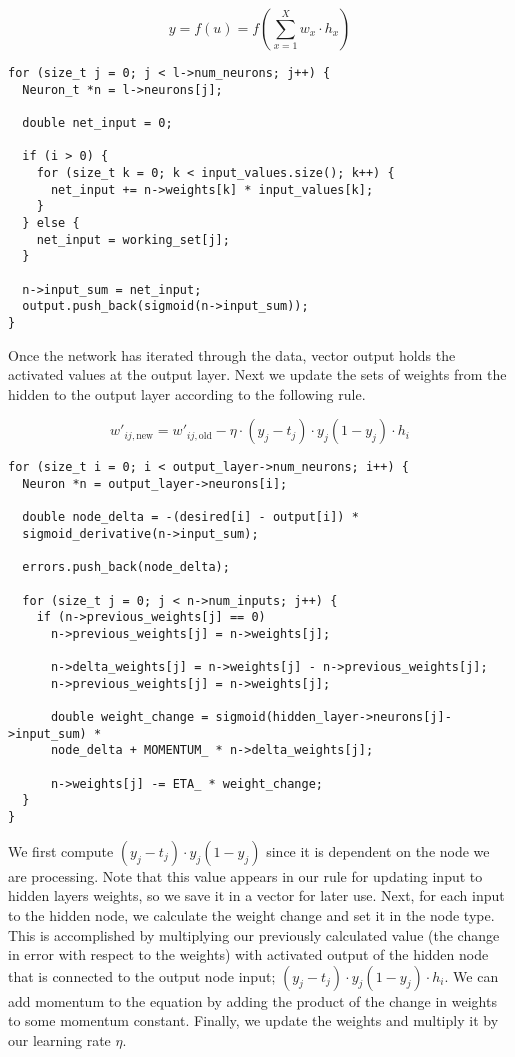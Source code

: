 \documentclass[11pt]{article}
\begin{document}
\[
y = f(u) = f(\sum\limits_{x=1}^{X} w_{x} \cdot h_{x})
\]


\begin{verbatim}
for (size_t j = 0; j < l->num_neurons; j++) {
  Neuron_t *n = l->neurons[j];

  double net_input = 0;

  if (i > 0) {
    for (size_t k = 0; k < input_values.size(); k++) {
      net_input += n->weights[k] * input_values[k];
    }
  } else {
    net_input = working_set[j];
  }

  n->input_sum = net_input;
  output.push_back(sigmoid(n->input_sum));
}
\end{verbatim}

Once the network has iterated through the data, vector output holds the activated values at the output layer. Next we update the sets of weights from the hidden to the output layer according to the following rule.

\[
w'_{ij,\text{new}} = w'_{ij,\text{old}} - \eta \cdot (y_j - t_j) \cdot y_j(1-y_j) \cdot h_i
\]

\begin{verbatim}
for (size_t i = 0; i < output_layer->num_neurons; i++) {
  Neuron *n = output_layer->neurons[i];

  double node_delta = -(desired[i] - output[i]) *
  sigmoid_derivative(n->input_sum);

  errors.push_back(node_delta);

  for (size_t j = 0; j < n->num_inputs; j++) {
    if (n->previous_weights[j] == 0)
      n->previous_weights[j] = n->weights[j];

      n->delta_weights[j] = n->weights[j] - n->previous_weights[j];
      n->previous_weights[j] = n->weights[j];

      double weight_change = sigmoid(hidden_layer->neurons[j]->input_sum) *
      node_delta + MOMENTUM_ * n->delta_weights[j];

      n->weights[j] -= ETA_ * weight_change;
  }
}
\end{verbatim}


We first compute \((y_j - t_j) \cdot y_j(1-y_j)\) since it is dependent on the node we are processing. Note that this value appears in our rule for updating input to hidden layers weights, so we save it in a vector for later use. Next, for each input to the hidden node, we calculate the weight change and set it in the node type. This is accomplished by multiplying our previously calculated value (the change in error with respect to the weights) with activated output of the hidden node that is connected to the output node input; \((y_j - t_j) \cdot y_j(1-y_j) \cdot h_i\). We can add momentum to the equation by adding the product of the change in weights to some momentum constant. Finally, we update the weights and multiply it by our learning rate \(\eta\).
\end{document}
